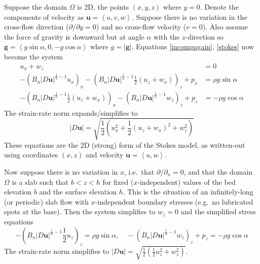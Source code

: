 \documentclass[letterpaper,final,12pt,reqno]{amsart}
\newcommand{\bg}{\mathbf{g}}
\newcommand{\bu}{\mathbf{u}}
\begin{document}
Suppose the domain $\Omega$ is 2D, the points $(x,y,z)$ where $y=0$.  Denote the components of velocity as $\bu=\left<u,v,w\right>$.  Suppose there is no variation in the cross-flow direction ($\partial/\partial y=0$) and no cross-flow velocity ($v=0$).  Also assume the force of gravity is downward but at angle $\alpha$ with the $z$-direction so $\bg = \left<g\sin\alpha,0,-g\cos\alpha\right>$ where $g=|\bg|$.  Equations \eqref{incompagain}, \eqref{stokes} now become the system
\begin{align}
u_x + w_z &= 0 \label{planeincomp} \\
- \left(B_n |D\bu|^{\frac{1}{n}-1} u_x\right)_x - \left(B_n |D\bu|^{\frac{1}{n}-1} \frac{1}{2} \left(u_z+w_x\right)\right)_z + p_x &= \rho g\sin\alpha \label{planestressx} \\
- \left(B_n |D\bu|^{\frac{1}{n}-1} \frac{1}{2} \left(u_z+w_x\right)\right)_x - \left(B_n |D\bu|^{\frac{1}{n}-1} w_z\right)_z + p_z &= -\rho g\cos\alpha \label{planestressz}
\end{align}
The strain-rate norm expands/simplifies to
\begin{equation}
    |D\bu| = \sqrt{\frac{1}{2} \left(u_x^2 + \frac{1}{2}(u_z+w_x)^2 + w_z^2\right)}  \label{planeDnorm}
\end{equation}
These equations are the 2D (strong) form of the Stokes model, as written-out using coordinates $(x,z)$ and velocity $\bu=\left<u,w\right>$.

Now suppose there is no variation in $x$, i.e.~that $\partial/\partial_x=0$, and that the domain $\Omega$ is a slab such that $b < z < h$ for fixed ($x$-independent) values of the bed elevation $b$ and the surface elevation $h$.  This is the situation of an infinitely-long (or periodic) slab flow with $x$-independent boundary stresses (e.g.~no lubricated spots at the base).  Then the system simplifies to $w_z=0$ and the simplified stress equations
\begin{equation}
- \left(B_n |D\bu|^{\frac{1}{n}-1} \frac{1}{2} u_z\right)_z = \rho g\sin\alpha, \quad
- \left(B_n |D\bu|^{\frac{1}{n}-1} w_z\right)_z + p_z = -\rho g\cos\alpha \label{slabstresses}
\end{equation}
The strain-rate norm simplifies to $|D\bu| = \sqrt{\frac{1}{2} \left(\frac{1}{2}u_z^2 + w_z^2\right)}$.
\end{document}
